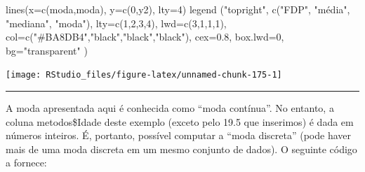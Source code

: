 \documentclass[
]{article}
\newenvironment{Shaded}{\begin{snugshade}}{\end{snugshade}}
\newcommand{\AttributeTok}[1]{\textcolor[rgb]{0.77,0.63,0.00}{#1}}
\newcommand{\DecValTok}[1]{\textcolor[rgb]{0.00,0.00,0.81}{#1}}
\newcommand{\FloatTok}[1]{\textcolor[rgb]{0.00,0.00,0.81}{#1}}
\newcommand{\FunctionTok}[1]{\textcolor[rgb]{0.00,0.00,0.00}{#1}}
\newcommand{\NormalTok}[1]{#1}
\newcommand{\StringTok}[1]{\textcolor[rgb]{0.31,0.60,0.02}{#1}}
\begin{document}
\begin{Shaded}
\begin{Highlighting}[]
\FunctionTok{lines}\NormalTok{(}\AttributeTok{x=}\FunctionTok{c}\NormalTok{(moda,moda), }\AttributeTok{y=}\FunctionTok{c}\NormalTok{(}\DecValTok{0}\NormalTok{,y2), }\AttributeTok{lty=}\DecValTok{4}\NormalTok{)}
\FunctionTok{legend}\NormalTok{ (}\StringTok{"topright"}\NormalTok{,}
        \FunctionTok{c}\NormalTok{(}\StringTok{"FDP"}\NormalTok{, }\StringTok{"média"}\NormalTok{, }\StringTok{"mediana"}\NormalTok{, }\StringTok{"moda"}\NormalTok{),}
        \AttributeTok{lty=}\FunctionTok{c}\NormalTok{(}\DecValTok{1}\NormalTok{,}\DecValTok{2}\NormalTok{,}\DecValTok{3}\NormalTok{,}\DecValTok{4}\NormalTok{),}
        \AttributeTok{lwd=}\FunctionTok{c}\NormalTok{(}\DecValTok{3}\NormalTok{,}\DecValTok{1}\NormalTok{,}\DecValTok{1}\NormalTok{,}\DecValTok{1}\NormalTok{),}
        \AttributeTok{col=}\FunctionTok{c}\NormalTok{(}\StringTok{"\#BA8DB4"}\NormalTok{,}\StringTok{"black"}\NormalTok{,}\StringTok{"black"}\NormalTok{,}\StringTok{"black"}\NormalTok{),}
        \AttributeTok{cex=}\FloatTok{0.8}\NormalTok{,}
        \AttributeTok{box.lwd=}\DecValTok{0}\NormalTok{, }\AttributeTok{bg=}\StringTok{"transparent"}        
\NormalTok{       )}
\end{Highlighting}
\end{Shaded}

\begin{center}\texttt{[image: RStudio\_files/figure-latex/unnamed-chunk-175-1]} \end{center}

\begin{center}\rule{0.5\linewidth}{0.5pt}\end{center}

A moda apresentada aqui é conhecida como ``moda contínua''. No entanto,
a coluna metodos\$Idade deste exemplo (exceto pelo 19.5 que inserimos) é
dada em números inteiros. É, portanto, possível computar a ``moda
discreta'' (pode haver mais de uma moda discreta em um mesmo conjunto de
dados). O seguinte código a fornece:
\end{document}
